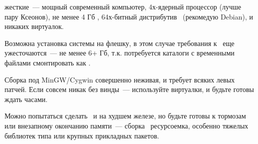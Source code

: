 
\secdown




жесткие\ --- мощный современный компьютер, 4х-ядерный процессор (лучше пару
Ксеонов), не менее 4 Гб \ram, 64х-битный дистрибутив \linux\ (рекомедую Debian),
и никаких виртуалок.

Возможна установка системы на флешку, в этом случае требования к \ram\ еще
ужесточаются\ --- не менее 6+ Гб, т.к. потребуется каталоги с временными файлами
смонтировать как .

Сборка под MinGW/Cygwin совершенно неживая, и требует всяких левых патчей.
Если совсем никак без винды\ --- используйте виртуалки, и будьте готовы ждать
часами.

Можно попытаться сделать \ и на худшем железе, но будьте
готовы к тормозам или внезапному окончанию памяти\ --- сборка \emlinux\
ресурсоемка, особенно тяжелых библиотек типа  или крупных
прикладных пакетов.


\secup
